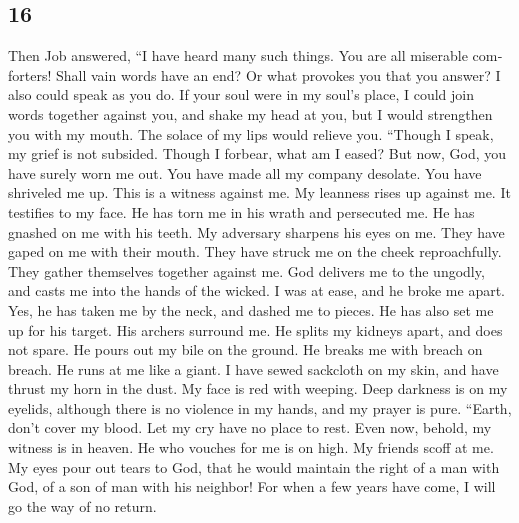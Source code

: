 \begin{paracol}{2}
\switchcolumn
\begin{otherlanguage}{english}

\hypertarget{section-31}{%
\section{16}\label{section-31}}

 Then Job answered,  ``I have heard many
such things. You are all miserable comforters!  Shall vain
words have an end? Or what provokes you that you answer? 
I also could speak as you do. If your soul were in my soul's place, I
could join words together against you, and shake my head at you,
 but I would strengthen you with my mouth. The solace of
my lips would relieve you.  ``Though I speak, my grief is
not subsided. Though I forbear, what am I eased?  But now,
God, you have surely worn me out. You have made all my company desolate.
 You have shriveled me up. This is a witness against me.
My leanness rises up against me. It testifies to my face. 
He has torn me in his wrath and persecuted me. He has gnashed on me with
his teeth. My adversary sharpens his eyes on me.  They
have gaped on me with their mouth. They have struck me on the cheek
reproachfully. They gather themselves together against me.
 God delivers me to the ungodly, and casts me into the
hands of the wicked.  I was at ease, and he broke me
apart. Yes, he has taken me by the neck, and dashed me to pieces. He has
also set me up for his target.  His archers surround me.
He splits my kidneys apart, and does not spare. He pours out my bile on
the ground.  He breaks me with breach on breach. He runs
at me like a giant.  I have sewed sackcloth on my skin,
and have thrust my horn in the dust.  My face is red with
weeping. Deep darkness is on my eyelids,  although there
is no violence in my hands, and my prayer is pure. 
``Earth, don't cover my blood. Let my cry have no place to rest.
 Even now, behold, my witness is in heaven. He who
vouches for me is on high.  My friends scoff at me. My
eyes pour out tears to God,  that he would maintain the
right of a man with God, of a son of man with his neighbor!
 For when a few years have come, I will go the way of no
return.


\end{otherlanguage}
\end{paracol}
